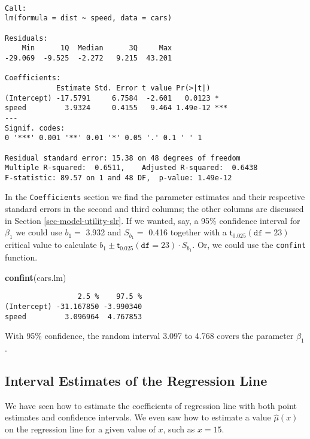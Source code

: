 \documentclass[]{book}
\newenvironment{Shaded}{\begin{snugshade}}{\end{snugshade}}
\newcommand{\KeywordTok}[1]{\textcolor[rgb]{0.13,0.29,0.53}{\textbf{{#1}}}}
\newcommand{\NormalTok}[1]{{#1}}
\numberwithin{equation}{chapter}
\numberwithin{figure}{chapter}
\theoremstyle{plain}
\theoremstyle{definition}
\theoremstyle{remark}
\theoremstyle{definition}
\theoremstyle{definition}
\theoremstyle{remark}
\begin{document}
\begin{verbatim}

Call:
lm(formula = dist ~ speed, data = cars)

Residuals:
    Min      1Q  Median      3Q     Max 
-29.069  -9.525  -2.272   9.215  43.201 

Coefficients:
            Estimate Std. Error t value Pr(>|t|)    
(Intercept) -17.5791     6.7584  -2.601   0.0123 *  
speed         3.9324     0.4155   9.464 1.49e-12 ***
---
Signif. codes:  
0 '***' 0.001 '**' 0.01 '*' 0.05 '.' 0.1 ' ' 1

Residual standard error: 15.38 on 48 degrees of freedom
Multiple R-squared:  0.6511,    Adjusted R-squared:  0.6438 
F-statistic: 89.57 on 1 and 48 DF,  p-value: 1.49e-12
\end{verbatim}

In the \texttt{Coefficients} section we find the parameter estimates and
their respective standard errors in the second and third columns; the
other columns are discussed in Section \ref{sec-model-utility-slr}. If
we wanted, say, a 95\% confidence interval for \(\beta_{1}\) we could
use \(b_{1} =\) 3.932 and \(S_{b_{1}} =\) 0.416 together with a
\(\mathsf{t}_{0.025}(\mathtt{df}=23)\) critical value to calculate
\(b_{1} \pm \mathsf{t}_{0.025}(\mathtt{df} = 23) \cdot S_{b_{1}}\). Or,
we could use the \texttt{confint} function.

\begin{Shaded}
\begin{Highlighting}[]
\KeywordTok{confint}\NormalTok{(cars.lm)}
\end{Highlighting}
\end{Shaded}

\begin{verbatim}
                 2.5 %    97.5 %
(Intercept) -31.167850 -3.990340
speed         3.096964  4.767853
\end{verbatim}

With 95\% confidence, the random interval 3.097 to 4.768 covers the
parameter \(\beta_{1}\).

\subsection{Interval Estimates of the Regression
Line}\label{sub-slr-interval-est-regline}

We have seen how to estimate the coefficients of regression line with
both point estimates and confidence intervals. We even saw how to
estimate a value \(\hat{\mu}(x)\) on the regression line for a given
value of \(x\), such as \(x=15\).
\end{document}
